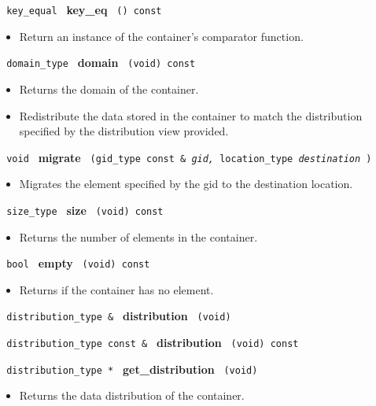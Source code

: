 \noindent
\texttt{%
key\_equal
}
\textbf{key\_eq}%
\texttt{%
() const
}

\begin{itemize}
\item
Return an instance of the container's comparator function.
\end{itemize}
 
\noindent
\texttt{%
domain\_type 	
}
\textbf{domain}%
\texttt{%
(void) const
}

\begin{itemize}
\item
Returns the domain of the container.
\end{itemize}
 
\begin{itemize}
\item
Redistribute the data stored in the container to match the distribution specified by the distribution view provided. 
\end{itemize}
 
\noindent
\texttt{%
void
}
\textbf{migrate}%
\texttt{%
(gid\_type const \&
\textit{gid,}
location\_type 
\textit{destination}
)
}

\begin{itemize}
\item
Migrates the element specified by the gid to the destination location. 
\end{itemize}
 
\noindent
\texttt{%
size\_type
}
\textbf{size}%
\texttt{%
(void) const
}

\begin{itemize}
\item
Returns the number of elements in the container. 
\end{itemize}
 
\noindent
\texttt{%
bool
}
\textbf{empty}%
\texttt{%
(void) const
}

\begin{itemize}
\item
Returns if the container has no element.
\end{itemize}
 
\noindent
\texttt{%
distribution\_type \& 
}
\textbf{distribution}%
\texttt{%
 (void)
}
 
\noindent
\texttt{%
distribution\_type const \& 
}
\textbf{distribution}%
\texttt{%
 (void) const
}
 
\noindent
\texttt{%
distribution\_type *
}
\textbf{get\_distribution}%
\texttt{%
(void)
}
 
\begin{itemize}
\item
Returns the data distribution of the container.
\end{itemize}

